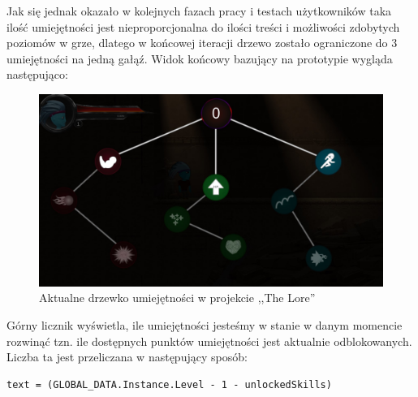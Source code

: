 \documentclass[oneside,polski,logo]{amuthesis}
\begin{document}
Jak się jednak okazało w kolejnych fazach pracy i testach użytkowników taka ilość umiejętności jest nieproporcjonalna do ilości treści i możliwości zdobytych poziomów w grze, dlatego w końcowej iteracji drzewo zostało ograniczone do 3 umiejętności na jedną gałąź. Widok końcowy bazujący na prototypie wygląda następująco:

\begin{figure}[h]
	\centering
	\includegraphics[width=13cm]{images/kozubal/drzewkoTheLore.jpg}
	\caption{Aktualne drzewko umiejętności w projekcie ,,The Lore''}
\end{figure}
\newpage
Górny licznik wyświetla, ile umiejętności jesteśmy w stanie w danym momencie rozwinąć tzn. ile dostępnych punktów umiejętności jest aktualnie odblokowanych. Liczba ta jest przeliczana w następujący sposób:

\begin{lstlisting}[breaklines=true,
language={[Sharp]C},
rulecolor=\color{blue!80!black},
caption={Fragment klasy \texttt{UI\_SkillTree.cs}}
]    
text = (GLOBAL_DATA.Instance.Level - 1 - unlockedSkills)
\end{lstlisting}
\end{document}
